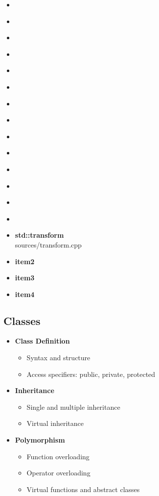 \documentclass{article}
\begin{document}
\begin{itemize}
        \item \textbf{}
        \item \textbf{}
        \item \textbf{}
        \item \textbf{}
        \item \textbf{}
        \item \textbf{}
        \item \textbf{}
        \item \textbf{}
        \item \textbf{}
        \item \textbf{}
        \item \textbf{}
        \item \textbf{}
        \item \textbf{}
        \item \textbf{}
        \item \textbf{std::transform} \\
           {sources/transform.cpp}
        \item \textbf{item2}
        \item \textbf{item3}
        \item \textbf{item4}
      \end{itemize}
    \subsection{Classes}
      \begin{itemize}
        \item \textbf{Class Definition}
          \begin{itemize}
            \item Syntax and structure
            \item Access specifiers: public, private, protected
          \end{itemize}
        \item \textbf{Inheritance}
          \begin{itemize}
            \item Single and multiple inheritance
            \item Virtual inheritance
          \end{itemize}
        \item \textbf{Polymorphism}
          \begin{itemize}
            \item Function overloading
            \item Operator overloading
            \item Virtual functions and abstract classes
          \end{itemize}
      \end{itemize}
\end{document}
